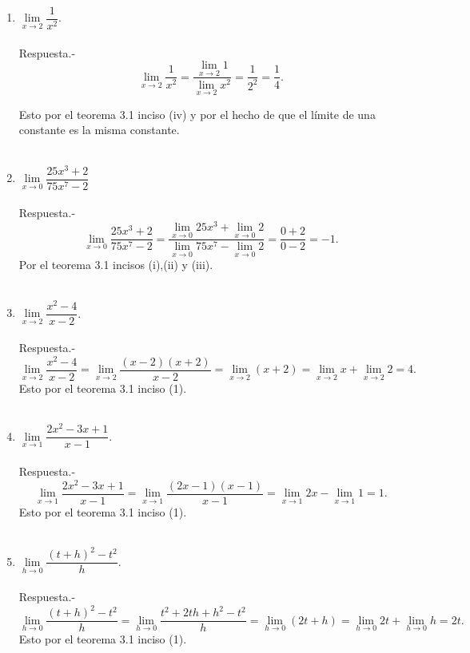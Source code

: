 \begin{enumerate}[\bfseries 1.]

    \item $\lim\limits_{x\to 2}\dfrac{1}{x^2}.$\\\\
	Respuesta.-\; 
	$$\lim\limits_{x\to 2}\dfrac{1}{x^2} = \dfrac{\lim\limits_{x\to 2}1}{\lim\limits_{x\to 2}x^2} = \dfrac{1}{2^2}=\dfrac{1}{4}.$$

	Esto por el teorema 3.1 inciso (iv) y por el hecho de que el límite de una constante es la misma constante.\\\\

    \item $\lim\limits_{x\to 0} \dfrac{25x^3+2}{75x^7-2}$\\\\
	Respuesta.-\; 
	$$\lim\limits_{x\to 0} \dfrac{25x^3+2}{75x^7-2}=\dfrac{\lim\limits_{x\to 0}25x^3+\lim\limits_{x\to 0}2}{\lim\limits_{x\to 0}75x^7-\lim\limits_{x\to 0}2} = \dfrac{0 + 2}{0-2}=-1.$$
	Por el teorema 3.1 incisos (i),(ii) y (iii).\\\\

    \item $\lim\limits_{x\to 2}\dfrac{x^2-4}{x-2}$.\\\\
	Respuesta.-\; 
	$$\lim\limits_{x\to 2}\dfrac{x^2-4}{x-2} = \lim_{x\to 2}\dfrac{(x-2)(x+2)}{x-2}=\lim_{x\to 2}(x+2) = \lim_{x\to 2} x + \lim_{x\to 2}2 = 4.$$
	Esto por el teorema 3.1 inciso (1).\\\\

    \item $\lim\limits_{x\to 1}\dfrac{2x^2-3x+1}{x-1}$.\\\\
	Respuesta.-\; 
	$$\lim\limits_{x\to 1}\dfrac{2x^2-3x+1}{x-1} = \lim_{x\to 1}\dfrac{(2x-1)(x-1)}{x-1}=\lim_{x\to 1} 2x - \lim_{x\to 1} 1 = 1.$$
	Esto por el teorema 3.1 inciso (1).\\\\

    \item $\lim\limits_{h\to 0}\dfrac{(t+h)^2-t^2}{h}.$\\\\
	Respuesta.-\; 
	$$\lim\limits_{h\to 0}\dfrac{(t+h)^2-t^2}{h} = \lim_{h\to 0}\dfrac{t^2+2th+h^2-t^2}{h}=\lim_{h \to 0} (2t+h) = \lim_{h\to 0}2t + \lim_{h\to 0}h = 2t.$$
	Esto por el teorema 3.1 inciso (1).\\\\


\end{enumerate}

